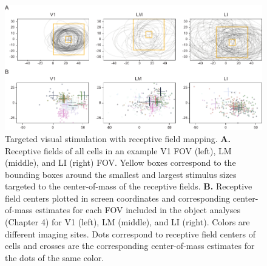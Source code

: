 \begin{figure}[t!]
\includegraphics[width=\textwidth]{figures/supplemental/fig_s5_vf_targeting/fig_s5_vf_targeting.pdf}
    \vspace{.1in}
    \caption[Visual Field Targeting]{Targeted visual stimulation with receptive field mapping.
    \textbf{A.} Receptive fields of all cells in an example V1 FOV (left), LM (middle), and LI (right) FOV. Yellow boxes correspond to the bounding boxes around the smallest and largest stimulus sizes targeted to the center-of-mass of the receptive fields.
    \textbf{B.} Receptive field centers plotted in screen coordinates and corresponding center-of-mass estimates for each FOV included in the object analyses (Chapter 4) for V1 (left), LM (middle), and LI (right). Colors are different imaging sites. Dots correspond to receptive field centers of cells and crosses are the corresponding center-of-mass estimates for the dots of the same color.
    \label{supfig:vf_targeting}}
\end{figure}


